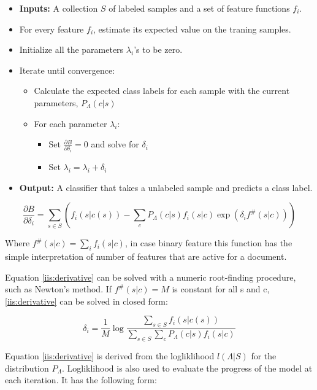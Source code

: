 \documentclass{report}
\begin{document}
\begin{itemize}
	\item \textbf{Inputs:} A collection $S$ of labeled samples and a set of feature functions $f_i$.
	\item For every feature $f_i$, estimate its expected value on the traning samples.
	\item Initialize all the parameters $\lambda_i$'s to be zero.
	\item Iterate until convergence:
	\begin{itemize}
		\item Calculate the expected class labels for each sample with the current parameters, $P_{\Lambda}(c|s)$
		\item For each parameter $\lambda_i$:
		\begin{itemize}
			\item Set $\frac{\partial B}{\partial \delta_i}  = 0$ and solve for $\delta_i$
			\item Set $\lambda_i = \lambda_i + \delta_i$
		\end{itemize}
	\end{itemize}
	\item \textbf{Output:} A classifier that takes a unlabeled sample and predicts a class label.
\end{itemize}

\begin{equation}
\label{iis:derivative}
\frac{\partial B}{\partial \delta_i} = \sum_{s \in S} (f_i (s|c(s)) - \sum_c P_{\Lambda}(c|s) f_i(s|c) \exp(\delta_i f^{\#}(s|c)))
\end{equation}

Where $f^{\#}(s|c) = \sum_i f_i (s|c)$, in case binary feature this function has the simple interpretation of number of features that are active for a document.

Equation \ref{iis:derivative} can be solved with a numeric root-finding procedure, such as Newton’s method. If $f^{\#}(s|c) = M$ is constant for all s and c, \ref{iis:derivative} can be solved in closed form:

\begin{equation}
\label{iis:delta}
\delta_i  = \frac{1}{M} \log \frac{\sum_{s \in S} f_i (s|c(s))}{\sum_{s \in S}\sum_{c} P_{\Lambda}(c|s) f_i(s|c) }
\end{equation}

Equation \ref{iis:derivative} is derived from the logliklihood $l(\Lambda|S)$ for the distribution $P_{\Lambda}$. Logliklihood is also used to evaluate the progress of the model at each iteration. It has the following form:
\end{document}
